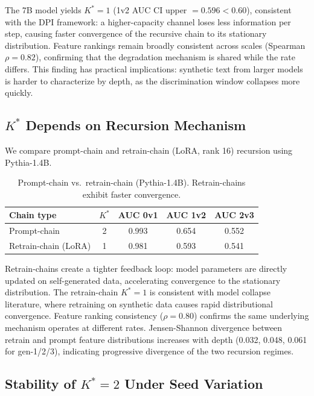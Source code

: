 \documentclass[11pt]{article}
\begin{document}
The 7B model yields $K^*{=}1$ (1v2 AUC CI upper $= 0.596 < 0.60$), consistent with the DPI framework: a higher-capacity channel loses less information per step, causing faster convergence of the recursive chain to its stationary distribution. Feature rankings remain broadly consistent across scales (Spearman $\rho = 0.82$), confirming that the degradation mechanism is shared while the rate differs. This finding has practical implications: synthetic text from larger models is harder to characterize by depth, as the discrimination window collapses more quickly.

\subsection{$K^*$ Depends on Recursion Mechanism}
\label{sec:retrain}

We compare prompt-chain and retrain-chain (LoRA, rank 16) recursion using Pythia-1.4B.

\begin{table}[h]
\centering
\caption{Prompt-chain vs.\ retrain-chain (Pythia-1.4B). Retrain-chains exhibit faster convergence.}
\label{tab:retrain}
\begin{tabular}{lcccc}
\toprule
Chain type & $K^*$ & AUC 0v1 & AUC 1v2 & AUC 2v3 \\
\midrule
Prompt-chain & 2 & 0.993 & 0.654 & 0.552 \\
Retrain-chain (LoRA) & 1 & 0.981 & 0.593 & 0.541 \\
\bottomrule
\end{tabular}
\end{table}

Retrain-chains create a tighter feedback loop: model parameters are directly updated on self-generated data, accelerating convergence to the stationary distribution. The retrain-chain $K^*{=}1$ is consistent with model collapse literature, where retraining on synthetic data causes rapid distributional convergence. Feature ranking consistency ($\rho = 0.80$) confirms the same underlying mechanism operates at different rates. Jensen-Shannon divergence between retrain and prompt feature distributions increases with depth (0.032, 0.048, 0.061 for gen-1/2/3), indicating progressive divergence of the two recursion regimes.

\subsection{Stability of $K^*{=}2$ Under Seed Variation}
\label{sec:stability}
\end{document}
